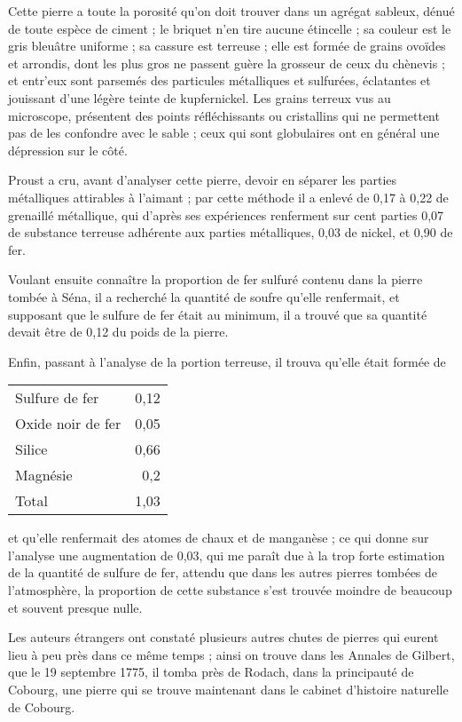 \documentclass[a4paper, 12pt, oneside, french]{article}
\begin{document}
Cette pierre a toute la porosité qu'on doit trouver dans un agrégat sableux, dénué de toute espèce de ciment ; le briquet n'en tire aucune étincelle ; sa couleur est le gris bleuâtre uniforme ; sa cassure est terreuse ; elle est formée de grains ovoïdes et arrondis, dont les plus gros ne passent guère la grosseur de ceux du chènevis ; et entr'eux sont parsemés des particules métalliques et sulfurées, éclatantes et jouissant d'une légère teinte de kupfernickel. Les grains terreux vus au microscope, présentent des points réfléchissants ou cristallins qui ne permettent pas de les confondre avec le sable ; ceux qui sont globulaires ont en général une dépression sur le côté.

Proust a cru, avant d'analyser cette pierre, devoir en séparer les parties métalliques attirables à l'aimant ; par cette méthode il a enlevé de 0,17 à 0,22 de grenaillé métallique, qui d'après ses expériences renferment sur cent parties 0,07 de substance terreuse adhérente aux parties métalliques, 0,03 de nickel, et 0,90 de fer.

Voulant ensuite connaître la proportion de fer sulfuré contenu dans la pierre tombée à Séna, il a recherché la quantité de soufre qu'elle renfermait, et supposant que le sulfure de fer était au minimum, il a trouvé que sa quantité devait être de 0,12 du poids de la pierre.

Enfin, passant à l'analyse de la portion terreuse, il trouva qu'elle était formée de
\begin{table}[H]
    \centering
    \begin{tabular}{l r}
        Sulfure de fer & 0,12 \\
        Oxide noir de fer & 0,05 \\
        Silice & 0,66 \\
        Magnésie & 0,2 \\ \hline
        Total & 1,03 \\
    \end{tabular}
\end{table}
et qu'elle renfermait des atomes de chaux et de manganèse ; ce qui donne sur l'analyse une augmentation de 0,03, qui me paraît due à la trop forte estimation de la quantité de sulfure de fer, attendu que dans les autres pierres tombées de l'atmosphère, la proportion de cette substance s'est trouvée moindre de beaucoup et souvent presque nulle.

Les auteurs étrangers ont constaté plusieurs autres chutes de pierres qui eurent lieu à peu près dans ce même temps ; ainsi on trouve dans les Annales de Gilbert, que le 19 septembre 1775, il tomba près de Rodach, dans la principauté de Cobourg, une pierre qui se trouve maintenant dans le cabinet d'histoire naturelle de Cobourg.
\end{document}
